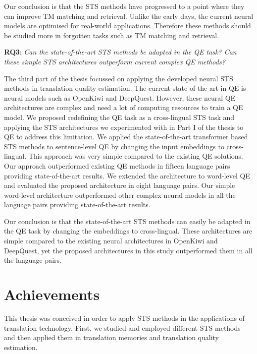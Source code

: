 Our conclusion is that the STS methods have progressed to a point where they can improve TM matching and retrieval. Unlike the early days, the current neural models are optimised for real-world applications. Therefore these methods should be studied more in forgotten tasks such as TM matching and retrieval.

\textbf{RQ3}: \textit{Can the state-of-the-art STS methods be adapted in the QE task? Can these simple STS architectures outperform current complex QE methods?}

The third part of the thesis focussed on applying the developed neural STS methods in translation quality estimation. The current state-of-the-art in QE is neural models such as OpenKiwi and DeepQuest. However, these neural QE architectures are complex and need a lot of computing resources to train a QE model. We proposed redefining the QE task as a cross-lingual STS task and applying the STS architectures we experimented with in Part I of the thesis to QE to address this limitation. We applied the state-of-the-art transformer based STS methods to sentence-level QE by changing the input embeddings to cross-lingual. This approach was very simple compared to the existing QE solutions. Our approach outperformed existing QE methods in fifteen language pairs providing state-of-the-art results. We extended the architecture to word-level QE and evaluated the proposed architecture in eight language pairs. Our simple word-level architecture outperformed other complex neural models in all the language pairs providing state-of-the-art results. 

Our conclusion is that the state-of-the-art STS methods can easily be adapted in the QE task by changing the embeddings to cross-lingual. These architectures are simple compared to the existing neural architectures in OpenKiwi and DeepQuest, yet the proposed architectures in this study outperformed them in all the language pairs. 

\section{Achievements}
\label{sec:achievements}
This thesis was conceived in order to apply STS methods in the applications of translation technology. First, we studied and employed different STS methods and then applied them in translation memories and translation quality estimation.

